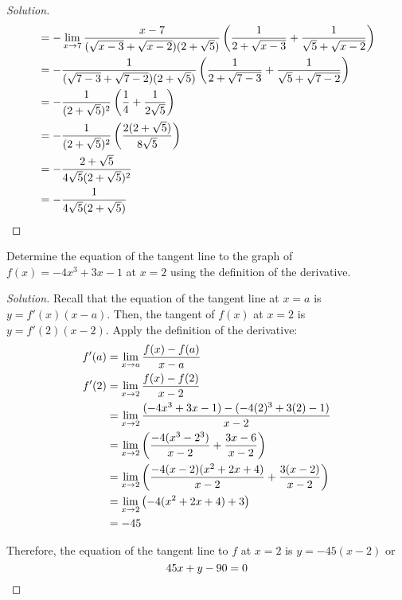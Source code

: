\begin{enumerate}[(a)]
\begin{proof}[Solution]
\begin{align*}
                  & = -\displaystyle\lim_{x\to7}\frac{x-7}{(\sqrt{x-3}+\sqrt{x-2})(2+\sqrt{5})}
            \left( \frac{1}{2+\sqrt{x-3}} + \frac{1}{\sqrt{5}+\sqrt{x-2}} \right)                                                        \\
                  & = -\frac{1}{(\sqrt{7-3}+\sqrt{7-2})(2+\sqrt{5})}
            \left( \frac{1}{2+\sqrt{7-3}} + \frac{1}{\sqrt{5}+\sqrt{7-2}} \right)                                                        \\
                  & = -\frac{1}{(2+\sqrt{5})^2}\left( \frac{1}{4} + \frac{1}{2\sqrt{5}} \right)                                          \\
                  & = -\frac{1}{(2+\sqrt{5})^2}\left( \frac{2(2+\sqrt{5})}{8\sqrt{5}} \right)                                            \\
                  & = -\frac{2+\sqrt{5}}{4\sqrt{5}(2+\sqrt{5})^2}                                                                        \\
                  & = -\frac{1}{4\sqrt{5}(2+\sqrt{5})} \qedhere
          \end{align*}
        \end{proof}
\end{enumerate}

\question Determine the equation of the tangent line to the graph of $f(x)=-4x^3+3x-1$ at $x=2$ using the definition of the derivative.
\begin{proof}[Solution]
  Recall that the equation of the tangent line at $x=a$ is $y=f'(x)(x-a)$.
  Then, the tangent of $f(x)$ at $x=2$ is $y=f'(2)(x-2)$.
  Apply the definition of the derivative:
  \begin{align*}
    f'(a) & = \displaystyle\lim_{x\to a} \frac{f(x)-f(a)}{x-a}                                             \\
    f'(2) & = \displaystyle\lim_{x\to2} \frac{f(x)-f(2)}{x-2}                                             \\
          & = \displaystyle\lim_{x\to2} \frac{(-4x^3 + 3x - 1) - (-4(2)^3 + 3(2) - 1)}{x-2}               \\
          & = \displaystyle\lim_{x\to2} \left( \frac{-4(x^3-2^3)}{x-2} + \frac{3x-6}{x-2} \right)         \\
          & = \displaystyle\lim_{x\to2} \left( \frac{-4(x-2)(x^2+2x+4)}{x-2} + \frac{3(x-2)}{x-2} \right) \\
          & = \displaystyle\lim_{x\to2} \left( -4(x^2+2x+4) + 3 \right)                                   \\
          & = -45
  \end{align*}

  Therefore, the equation of the tangent line to $f$ at $x=2$ is $y=-45(x-2)$ or
  \[ 45x + y - 90 = 0 \qedhere \]
\end{proof}

